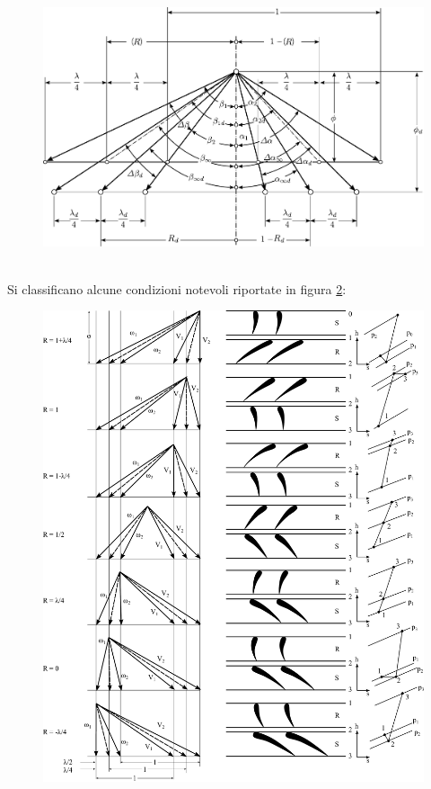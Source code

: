 \begin{figure}
\centering
  \includegraphics[width=\textwidth]{fig/CondFuoriProg.pdf}
\caption{}
\label{fig:CondFuoriProg}
\end{figure}
\\Si classificano alcune condizioni notevoli riportate in figura \ref{fig:ComprAssTab}:
\begin{figure}
\centering
  \includegraphics[width=1.2\textwidth]{fig/ComprAssTab.pdf}
\caption{}
\label{fig:ComprAssTab}
\end{figure}
